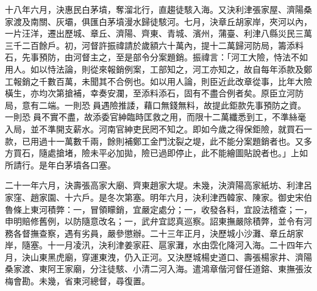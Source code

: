 \begin{pinyinscope}
十八年六月，決惠民白茅墳，奪溜北行，直趨徒駭入海。又決利津張家屋、濟陽桑家渡及南關、灰壩，俱匯白茅墳漫水歸徒駭河。七月，決章丘胡家岸，夾河以內，一片汪洋，遷出歷城、章丘、濟陽、齊東、青城、濱州，蒲臺、利津八縣災民三萬三千二百餘戶。初，河督許振禕請於歲額六十萬內，提十二萬歸河防局，籌添料石，先事預防，由河督主之，至是部令分案題銷。振禕言：「河工大險，恃法不如用人。如以恃法論，則從來報銷例案，工部知之，河工亦知之，故自每年添款及鄭工報銷之千數百萬，未聞其不合例也。如以用人論，則臣近此改章從事，比年大險橫生，亦均次第搶補，幸奏安瀾，至添料添石，固有不盡合例者矣。原臣立河防局，意有二端。一則恐員遇險推諉，藉口無錢無料，故提此鉅款先事預防之資。一則恐員不實不盡，故添委官紳臨時匡救之用，而限十二萬纖悉到工，不準絲毫入局，並不準開支薪水。河南官紳吏民罔不知之。即如今歲之得保鉅險，就買石一款，已用過十一萬數千兩，餘則補鄭工金門沈裂之堤，此不能分案題銷者也。又多方買石，隨處搶堵，險未平必加拋，險已過即停止，此不能繪圖貼說者也。」上如所請行。是年白茅墳各口塞。

二十一年六月，決壽張高家大廟、齊東趙家大堤。未幾，決濟陽高家紙坊、利津呂家窪、趙家園、十六戶。是冬次第塞。明年六月，決利津西韓家、陳家。御史宋伯魯條上東河積弊：一，冒領矇銷，宜嚴定處分；一，收發各料，宜設法稽查；一，申明賠修舊例，以防隨意改名；一，武弁宜認真巡察。詔東撫嚴除積弊，並令有河務各督撫查察，遇有劣員，嚴參懲辦。二十三年正月，決歷城小沙灘、章丘胡家岸，隨塞。十一月凌汛，決利津姜家莊、扈家灘，水由霑化降河入海。二十四年六月，決山東黑虎廟，穿運東洩，仍入正河。又決歷城楊史道口、壽張楊家井、濟陽桑家渡、東阿王家廟，分注徒駭、小清二河入海。遣鴻章偕河督任道鎔、東撫張汝梅會勘。未幾，省東河總督，尋復置。


\end{pinyinscope}
